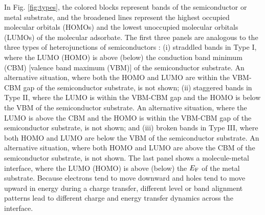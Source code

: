 \documentclass[aip, amsmath, amssymb, reprint, longbibliography]{revtex4-2}
\begin{document}
In Fig. \ref{fig:types}, the colored blocks represent bands of the semiconductor or metal substrate, and the broadened lines represent the highest occupied molecular orbitals (HOMOs) and the lowest unoccupied molecular orbitals (LUMOs) of the molecular adsorbate. The first three panels are analogous to the three types of heterojunctions of semiconductors \cite{I10}: (i) straddled bands in Type I, where the LUMO (HOMO) is above (below) the conduction band minimum (CBM) [valence band maximum (VBM)] of the semiconductor substrate. An alternative situation, where both the HOMO and LUMO are within the VBM-CBM gap of the semiconductor substrate, is not shown; (ii) staggered bands in Type II, where the LUMO is within the VBM-CBM gap and the HOMO is below the VBM of the semiconductor substrate. An alternative situation, where the LUMO is above the CBM and the HOMO is within the VBM-CBM gap of the semiconductor substrate, is not shown; and (iii) broken bands in Type III, where both HOMO and LUMO are below the VBM of the semiconductor substrate. An alternative situation, where both HOMO and LUMO are above the CBM of the semiconductor substrate, is not shown. The last panel shows a molecule-metal interface, where the LUMO (HOMO) is above (below) the $E_{\rm F}$ of the metal substrate. Because electrons tend to move downward and holes tend to move upward in energy during a charge transfer, different level or band alignment patterns lead to different charge and energy transfer dynamics across the interface.
\end{document}
